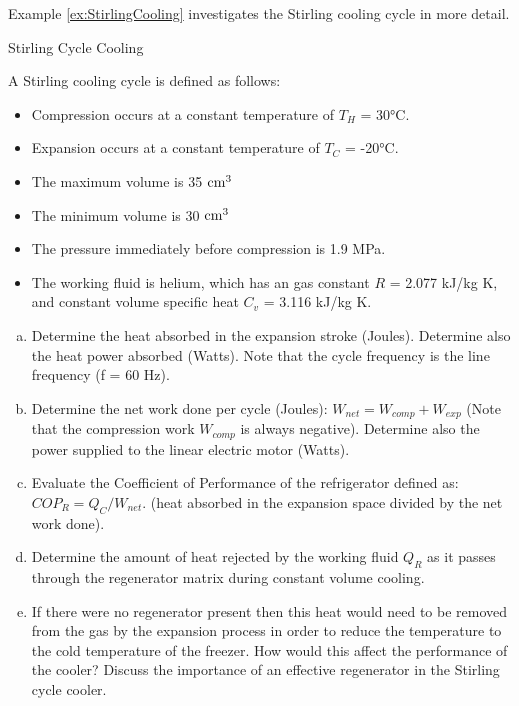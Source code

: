 Example \ref{ex:StirlingCooling} investigates the Stirling cooling cycle in more detail.
\newpage
\begin{example}[label={ex:StirlingCooling}]{Stirling Cycle Cooling}

  A Stirling cooling cycle is defined as follows:
  \begin{itemize}
  \item Compression occurs at a constant temperature of $T_H$ = 30°C.
  \item Expansion occurs at a constant temperature of $T_C$ = -20°C.
  \item The maximum volume is 35 $\rm cm^3$
  \item The minimum volume is 30 $\rm cm^3$
  \item The pressure immediately before compression is 1.9 MPa.
  \item The working fluid is helium, which has an gas constant $R$ = 2.077 kJ/kg K, and constant volume specific heat $C_v$ = 3.116 kJ/kg K.
  \end{itemize}

\begin{enumerate}[a)]
\item Determine the heat absorbed in the expansion stroke (Joules). Determine also the heat power absorbed (Watts). Note that the cycle frequency is the line frequency (f = 60 Hz).

\item Determine the net work done per cycle (Joules): $W_{net} = W_{comp} + W_{exp}$ (Note that the compression work $W_{comp}$ is always negative). Determine also the power supplied to the linear electric motor (Watts).
  
\item Evaluate the Coefficient of Performance of the refrigerator defined as: $COP_R = Q_C / W_{net}$. (heat absorbed in the expansion space divided by the net work done). 

\item Determine the amount of heat rejected by the working fluid $Q_R$ as it passes through the regenerator matrix during constant volume cooling.

\item If there were no regenerator present then this heat would need to be removed from the gas by the expansion process in order to reduce the temperature to the cold temperature of the freezer. How would this affect the performance of the cooler? Discuss the importance of an effective regenerator in the Stirling cycle cooler.
\end{enumerate}


\end{example}

